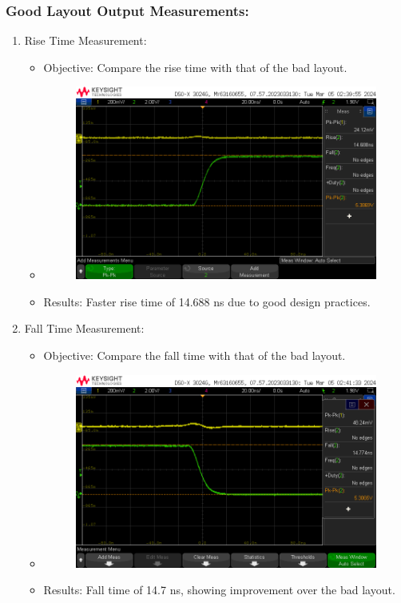 \documentclass[a4paper,11pt]{article}%
\begin{document}
\subsubsection{Good Layout Output Measurements:}
\begin{enumerate}
	\item Rise Time Measurement:
	\begin{itemize}
		\item Objective: Compare the rise time with that of the bad layout.
		\item 
		\begin{figure}[H]
			\centering
			\includegraphics[scale=0.6]{figures/good/quite_low/rise/rising_good_low.png}
			
			
		\end{figure}
		\item Results: Faster rise time of 14.688 ns due to good design practices.
	\end{itemize}
	
	\item Fall Time Measurement:
	\begin{itemize}
		\item Objective: Compare the fall time with that of the bad layout.
		\item 
		\begin{figure}[H]
			\centering
			\includegraphics[scale=0.6]{figures/good/quite_low/fall/falling_ql_good.png}
		\end{figure}
		\item Results: Fall time of 14.7 ns, showing improvement over the bad layout.
	\end{itemize}
	

\end{enumerate}
\end{document}
